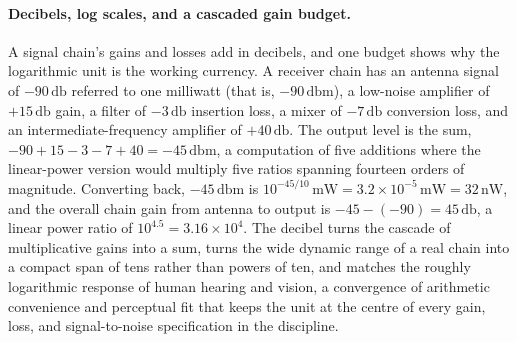 \paragraph{Decibels, log scales, and a cascaded gain budget.}
A signal chain's gains and losses add in decibels, and one budget shows why the
logarithmic unit is the working currency. A receiver chain has an antenna signal
of $-90\,\si{\decibel}$ referred to one milliwatt (that is, $-90\,\si{\decibel}$m),
a low-noise amplifier of $+15\,\si{\decibel}$ gain, a filter of $-3\,\si{
\decibel}$ insertion loss, a mixer of $-7\,\si{\decibel}$ conversion loss, and an
intermediate-frequency amplifier of $+40\,\si{\decibel}$. The output level is the
sum, $-90 + 15 - 3 - 7 + 40 = -45\,\si{\decibel}$m, a computation of five
additions where the linear-power version would multiply five ratios spanning
fourteen orders of magnitude. Converting back, $-45\,\si{\decibel}$m is
$10^{-45/10}\,\si{\milli\watt} = 3.2\times 10^{-5}\,\si{\milli\watt} = 32\,\si{
\nano\watt}$, and the overall chain gain from antenna to output is $-45 - (-90) =
45\,\si{\decibel}$, a linear power ratio of $10^{4.5} = 3.16\times 10^{4}$. The
decibel turns the cascade of multiplicative gains into a sum, turns the wide
dynamic range of a real chain into a compact span of tens rather than powers of
ten, and matches the roughly logarithmic response of human hearing and vision, a
convergence of arithmetic convenience and perceptual fit that keeps the unit at
the centre of every gain, loss, and signal-to-noise specification in the
discipline.

